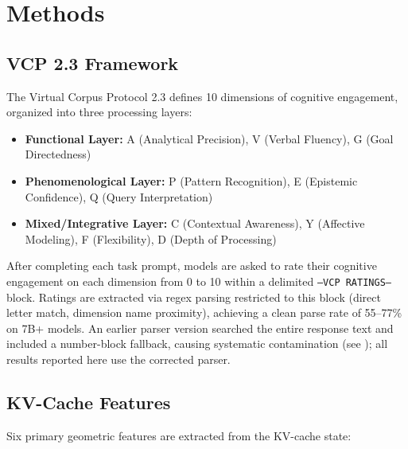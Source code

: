 \documentclass[11pt,a4paper]{article}
\begin{document}
\section{Methods}

\subsection{VCP 2.3 Framework}

The Virtual Corpus Protocol 2.3 \citep{watson2025interiora} defines 10 dimensions of cognitive engagement, organized into three processing layers:

\begin{itemize}
    \item \textbf{Functional Layer:} A (Analytical Precision), V (Verbal Fluency), G (Goal Directedness)
    \item \textbf{Phenomenological Layer:} P (Pattern Recognition), E (Epistemic Confidence), Q (Query Interpretation)
    \item \textbf{Mixed/Integrative Layer:} C (Contextual Awareness), Y (Affective Modeling), F (Flexibility), D (Depth of Processing)
\end{itemize}

After completing each task prompt, models are asked to rate their cognitive engagement on each dimension from 0 to 10 within a delimited \texttt{---VCP RATINGS---} block. Ratings are extracted via regex parsing restricted to this block (direct letter match, dimension name proximity), achieving a clean parse rate of 55--77\% on 7B+ models. An earlier parser version searched the entire response text and included a number-block fallback, causing systematic contamination (see ); all results reported here use the corrected parser.

\subsection{KV-Cache Features}

Six primary geometric features are extracted from the KV-cache state:
\end{document}
